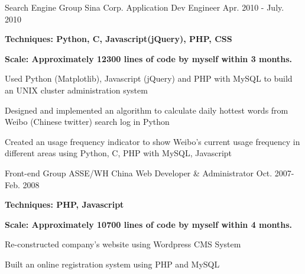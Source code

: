 
\begin{cventries}
  \cventry
    {Search Engine Group}
    {Sina Corp.}
    {Application Dev Engineer}
    {Apr. 2010 - July. 2010}
    {
      \begin{cvitems} 
            \item \textbf{Techniques: Python, C, Javascript(jQuery), PHP, CSS} 
            \item \textbf{Scale: Approximately 12300 lines of code by myself within 3 months.}
		\item{Used Python (Matplotlib), Javascript (jQuery) and PHP with MySQL to build an UNIX cluster administration system}
		\item{Designed and implemented an algorithm to calculate daily hottest words from Weibo (Chinese twitter) search log in Python}
		\item{Created an usage frequency indicator to show Weibo's  current usage frequency in different areas using Python, C, PHP with MySQL, Javascript }     
    	 \end{cvitems}
    }
  \cventry
    {Front-end Group}
    {ASSE/WH China}
    {Web Developer \& Administrator}
    {Oct. 2007- Feb. 2008}
    {
      \begin{cvitems}
                  \item \textbf{Techniques: PHP, Javascript} 
                  \item \textbf{Scale: Approximately 10700 lines of code by myself within 4 months.}
		\item{Re-constructed company's website using Wordpress CMS System}
		\item{Built an online registration system using PHP and MySQL}
		      \end{cvitems}
    }
\end{cventries}


